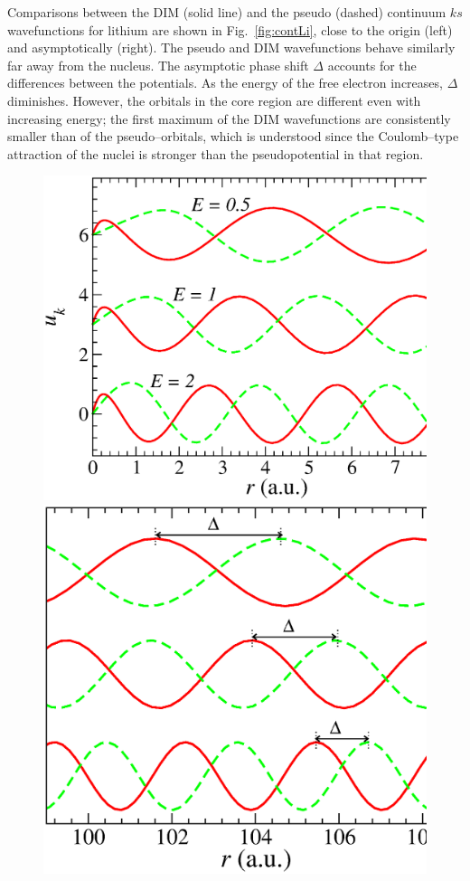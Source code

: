 \documentclass[10pt]{article}
\begin{document}
Comparisons between the DIM (solid line) and the pseudo (dashed)
continuum $ks$ wavefunctions for lithium are shown in 
Fig.~\ref{fig:contLi}, close to the origin (left) and asymptotically 
(right). The pseudo and DIM wavefunctions behave similarly far away 
from the nucleus. The asymptotic phase shift $\Delta$ accounts for 
the differences between the potentials. As the energy of the free 
electron increases, $\Delta$ diminishes. However, the orbitals in the 
core region are different even with increasing energy; the first 
maximum of the DIM wavefunctions are consistently smaller than of the 
pseudo--orbitals, which is understood since the Coulomb--type 
attraction of the nuclei is stronger than the pseudopotential in that 
region. 
\begin{figure}[H]
\centering
\includegraphics[height=0.23\textheight]{figures/pseudopot/LicontA.eps}
\includegraphics[height=0.23\textheight]{figures/pseudopot/LicontB.eps}

\end{figure}
\end{document}
